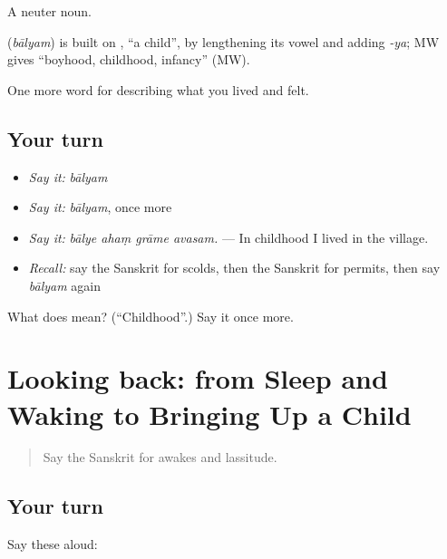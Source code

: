 A neuter noun.

\begin{cousinweb}
\textbf{} (\emph{bālyam}) is built on \textbf{}, \textquotedblleft{}a child\textquotedblright{}, by lengthening its vowel and adding \emph{-ya}; MW gives \textquotedblleft{}boyhood, childhood, infancy\textquotedblright{} (MW).
\end{cousinweb}

\begin{grammarlens}[title={What you've built}]
One more word for describing what you lived and felt.
\end{grammarlens}

\subsection*{Your turn}
\begin{itemize}
\raggedright
  \item \emph{Say it:} \emph{bālyam}
  \item \emph{Say it:} \emph{bālyam}, once more
  \item \emph{Say it:} \emph{bālye ahaṃ grāme avasam.} — In childhood I lived in the village.
  \item \emph{Recall:} say the Sanskrit for scolds, then the Sanskrit for permits, then say \emph{bālyam} again
\end{itemize}

\begin{tcolorbox}[breakable,colback=teal!4,colframe=teal!35!black,title={Before you move on}]
What does  mean? (\textquotedblleft{}Childhood\textquotedblright{}.) Say it once more.
\end{tcolorbox}
\section[(dialogue)]{Looking back: from Sleep and Waking to Bringing Up a Child}

\label{lesson:SA-R494-review-488-494}



\begin{quote}
Say the Sanskrit for awakes and lassitude.
\end{quote}

\subsection*{Your turn}
Say these aloud:

